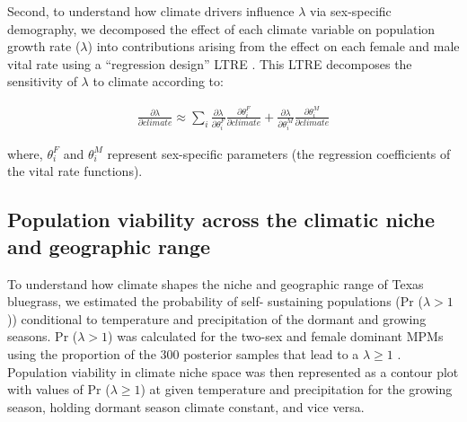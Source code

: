 \documentclass[9pt,twocolumn,twoside,lineno]{pnas-new}
\newcommand{\tom}[2]{{\color{red}{#1}}\footnote{\textit{\color{red}{#2}}}}
\newcommand{\jacob}[2]{{\color{blue}{#1}}\footnote{\textit{\color{blue}{#2}}}}
\begin{document}
Second, to understand how climate drivers influence $\lambda$ via sex-specific demography, we decomposed the effect of each climate variable on population growth rate ($\lambda$) into contributions arising from the effect on each female and male vital rate using a ``regression design'' LTRE \citep{caswell1989analysis}.
This LTRE decomposes the sensitivity of $\lambda$ to climate according to:

\begin{align}\label{eq:ltresex}
\frac{\partial \lambda}{\partial climate} \approx \sum_{i} \frac{\partial \lambda}{\partial \theta^{F}_{i}} \frac{\partial \theta^{F}_{i}}{\partial climate} + \frac{\partial \lambda}{\partial \theta^{M}_{i}} \frac{\partial \theta^{M}_{i}}{\partial climate}
\end{align}

\noindent where, $\theta^{F}_{i}$ and $\theta^{M}_{i}$ represent sex-specific parameters (the regression coefficients of the vital rate functions). 

\subsection*{Population viability across the climatic niche and geographic range}
To understand how climate shapes the niche and geographic range of Texas bluegrass, we estimated the probability of self- sustaining populations (Pr ($\lambda > 1$)) conditional to temperature and precipitation of the dormant and growing seasons.
Pr ($\lambda > 1$) was calculated for the two-sex and female dominant MPMs using the proportion of the 300 posterior samples that lead to a $\lambda \ge 1$ \citep{diez2014probabilistic}.
Population viability in climate niche space was then represented as a contour plot with values of Pr ($\lambda \ge 1$) at given temperature and precipitation for the growing season, holding dormant season climate constant, and vice versa. 
\end{document}
